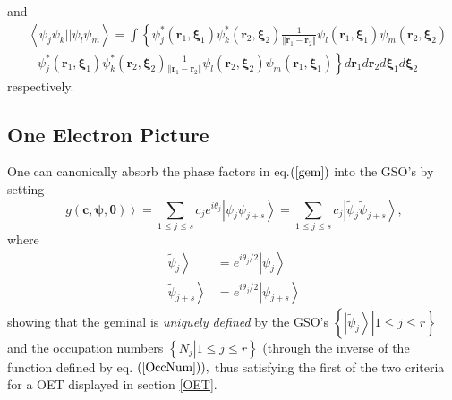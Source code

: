 \documentclass[aps,preprint]{revtex4}%
\begin{document}
and
\begin{align}
&  \left\langle \psi_{j}\psi_{k}||\psi_{l}\psi_{m}\right\rangle =\int\left\{
\psi_{j}^{\ast}\left(  \boldsymbol{r}_{1},\boldsymbol{\xi}_{1}\right)
\psi_{k}^{\ast}\left(  \boldsymbol{r}_{2},\boldsymbol{\xi}_{2}\right)
\frac{1}{\left\Vert \boldsymbol{r}_{1}-\boldsymbol{r}_{2}\right\Vert }\psi
_{l}\left(  \boldsymbol{r}_{1},\boldsymbol{\xi}_{1}\right)  \psi_{m}\left(
\boldsymbol{r}_{2},\boldsymbol{\xi}_{2}\right)  \right.  \nonumber\\
&  -\left.  \psi_{j}^{\ast}\left(  \boldsymbol{r}_{1},\boldsymbol{\xi}%
_{1}\right)  \psi_{k}^{\ast}\left(  \boldsymbol{r}_{2},\boldsymbol{\xi}%
_{2}\right)  \frac{1}{\left\Vert \boldsymbol{r}_{1}-\boldsymbol{r}%
_{2}\right\Vert }\psi_{l}\left(  \boldsymbol{r}_{2},\boldsymbol{\xi}%
_{2}\right)  \psi_{m}\left(  \boldsymbol{r}_{1},\boldsymbol{\xi}_{1}\right)
\right\}  d\boldsymbol{r}_{1}d\boldsymbol{r}_{2}d\boldsymbol{\xi}%
_{1}d\boldsymbol{\xi}_{2}%
\end{align}
respectively.

\subsection{One Electron Picture\label{OneElecPic}}

One can canonically absorb the phase factors in eq.$\left(  \ref{gem}\right)
$ into the GSO's by setting
\begin{equation}
\left\vert g\left(  \boldsymbol{c},\boldsymbol{\psi},\boldsymbol{\theta
}\right)  \right\rangle =\sum_{1\leq j\leq s}c_{j}e^{i\theta_{j}}\left\vert
\psi_{j}\psi_{j+s}\right\rangle =\sum_{1\leq j\leq s}c_{j}\left\vert
\tilde{\psi}_{j}\tilde{\psi}_{j+s}\right\rangle ,
\end{equation}
where
\begin{align}
\left\vert \tilde{\psi}_{j}\right\rangle  &  =e^{i\theta_{j}/2}\left\vert
\psi_{j}\right\rangle \nonumber\\
\left\vert \tilde{\psi}_{j+s}\right\rangle  &  =e^{i\theta_{j}/2}\left\vert
\psi_{j+s}\right\rangle
\end{align}
showing that the geminal is \emph{uniquely defined} by the GSO's $\left\{
\left.  \left\vert \tilde{\psi}_{j}\right\rangle \right\vert 1\leq j\leq
r\right\}  $ and the occupation numbers $\left\{  \left.  N_{j}\right\vert
1\leq j\leq r\right\}  $ (through the inverse of the function defined by eq.
$\left(  \ref{OccNum}\right)  ),$ thus satisfying the first of the two
criteria for a OET displayed in section \ref{OET}.
\end{document}
